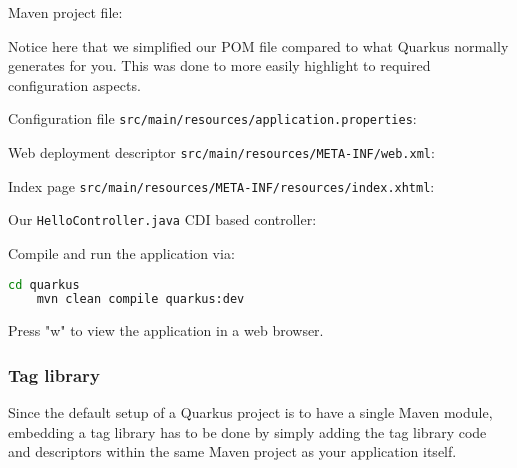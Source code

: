 Maven project file:

Notice here that we simplified our POM file compared to what Quarkus normally generates for you.
This was done to more easily highlight to required configuration aspects.

Configuration file \texttt{src/main/resources/application.properties}:


Web deployment descriptor \texttt{src/main/resources/META-INF/web.xml}:


Index page \texttt{src/main/resources/META-INF/resources/index.xhtml}:


Our \texttt{HelloController.java} CDI based controller:


Compile and run the application via:
\begin{lstlisting}[language=bash]
	cd quarkus
	mvn clean compile quarkus:dev
\end{lstlisting}
Press "w" to view the application in a web browser.

\subsubsection{Tag library}
Since the default setup of a Quarkus project is to have a single Maven module,
embedding a tag library has to be done by simply adding the tag library code and descriptors within the same Maven project as your application itself.


